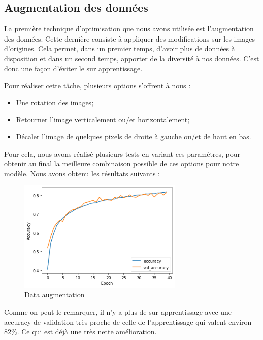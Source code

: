 \documentclass[12pt,titlepage]{article}
\begin{document}
\subsection{Augmentation des données}

La première technique d'optimisation que nous avons utilisée est l'augmentation des données. Cette dernière consiste à appliquer des modifications sur les images d'origines. Cela permet, dans un premier temps, d'avoir plus de données à disposition et dans un second temps, apporter de la diversité à nos données. C'est donc une façon d'éviter le sur apprentissage.

Pour réaliser cette tâche, plusieurs options s'offrent à nous :

\begin{itemize}
\item Une rotation des images;
\item Retourner l'image verticalement ou/et horizontalement;
\item Décaler l'image de quelques pixels de droite à gauche ou/et de haut en bas.
\end{itemize}

Pour cela, nous avons réalisé plusieurs tests en variant ces paramètres, pour obtenir au final la meilleure combinaison possible de ces options pour notre modèle. Nous avons obtenu les résultats suivants :

\newpage

\begin{figure}[!h]
\centering
\includegraphics[width=0.7\textwidth]{img/with_data_aug_acc.png}
\caption{Data augmentation}
\end{figure}

Comme on peut le remarquer, il n'y a plus de sur apprentissage avec une accuracy de validation très proche de celle de l'apprentissage qui valent environ $82\%$. Ce qui est déjà une très nette amélioration.
\end{document}
